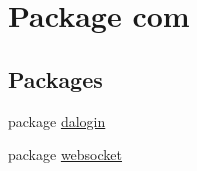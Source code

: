 \hypertarget{namespacecom}{}\section{Package com}
\label{namespacecom}
\subsection*{Packages}
\begin{DoxyCompactItemize}
\item 
package \hyperlink{namespacecom_1_1dalogin}{dalogin}
\item 
package \hyperlink{namespacecom_1_1websocket}{websocket}
\end{DoxyCompactItemize}
